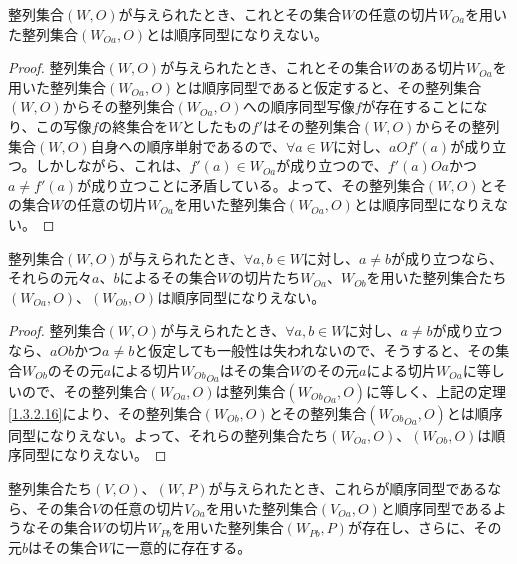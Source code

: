 \documentclass[dvipdfmx]{jsarticle}
\begin{document}
\begin{thm}\label{1.3.2.16}
整列集合$(W,O)$が与えられたとき、これとその集合$W$の任意の切片$W_{Oa}$を用いた整列集合$\left( W_{Oa},O \right)$とは順序同型になりえない。
\end{thm}
\begin{proof}
整列集合$(W,O)$が与えられたとき、これとその集合$W$のある切片$W_{Oa}$を用いた整列集合$\left( W_{Oa},O \right)$とは順序同型であると仮定すると、その整列集合$(W,O)$からその整列集合$\left( W_{Oa},O \right)$への順序同型写像$f$が存在することになり、この写像$f$の終集合を$W$としたもの$f'$はその整列集合$(W,O)$からその整列集合$(W,O)$自身への順序単射であるので、$\forall a \in W$に対し、$aOf'(a)$が成り立つ。しかしながら、これは、$f'(a) \in W_{Oa}$が成り立つので、$f'(a)Oa$かつ$a \neq f'(a)$が成り立つことに矛盾している。よって、その整列集合$(W,O)$とその集合$W$の任意の切片$W_{Oa}$を用いた整列集合$\left( W_{Oa},O \right)$とは順序同型になりえない。
\end{proof}
\begin{thm}\label{1.3.2.17}
整列集合$(W,O)$が与えられたとき、$\forall a,b \in W$に対し、$a \neq b$が成り立つなら、それらの元々$a$、$b$によるその集合$W$の切片たち$W_{Oa}$、$W_{Ob}$を用いた整列集合たち$\left( W_{Oa},O \right)$、$\left( W_{Ob},O \right)$は順序同型になりえない。
\end{thm}
\begin{proof}
整列集合$(W,O)$が与えられたとき、$\forall a,b \in W$に対し、$a \neq b$が成り立つなら、$aOb$かつ$a \neq b$と仮定しても一般性は失われないので、そうすると、その集合$W_{Ob}$のその元$a$による切片${W_{Ob}}_{Oa}$はその集合$W$のその元$a$による切片$W_{Oa}$に等しいので、その整列集合$\left( W_{Oa},O \right)$は整列集合$\left( {W_{Ob}}_{Oa},O \right)$に等しく、上記の定理\ref{1.3.2.16}により、その整列集合$\left( W_{Ob},O \right)$とその整列集合$\left( {W_{Ob}}_{Oa},O \right)$とは順序同型になりえない。よって、それらの整列集合たち$\left( W_{Oa},O \right)$、$\left( W_{Ob},O \right)$は順序同型になりえない。
\end{proof}
\begin{thm}\label{1.3.2.18}
整列集合たち$(V,O)$、$(W,P)$が与えられたとき、これらが順序同型であるなら、その集合$V$の任意の切片$V_{Oa}$を用いた整列集合$\left( V_{Oa},O \right)$と順序同型であるようなその集合$W$の切片$W_{Pb}$を用いた整列集合$\left( W_{Pb},P \right)$が存在し、さらに、その元$b$はその集合$W$に一意的に存在する。
\end{thm}
\end{document}
